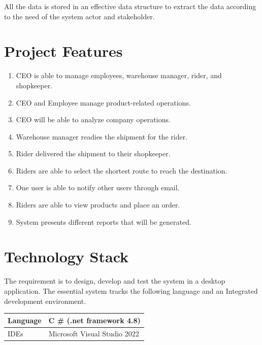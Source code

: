 \documentclass[12pt,a4paper]{report}
\begin{document}
All the data is stored in an effective data structure to extract the data according to the need of the system actor and stakeholder.

\newpage
\chapter {Project Features}

\begin{enumerate}
\item CEO is able to manage employees, warehouse manager, rider, and shopkeeper.  
\item CEO and Employee manage product-related operations.
\item CEO will be able to analyze company operations.  
\item Warehouse manager readies the shipment for the rider. 
\item Rider delivered the shipment to their shopkeeper. 
\item Riders are able to select the shortest route to reach the destination.  
\item One user is able to notify other users through email.
\item Riders are able to view products and place an order. 
\item System presents different reports that will be generated.

\end{enumerate}

\newpage
\chapter {Technology Stack}
The requirement is to design, develop and test the system in a desktop application. The essential system tracks the following language and an Integrated development environment.
 \\ 
\begin{tabularx}{0.9\textwidth} { 
  | >{\raggedright\arraybackslash}X 
  | >{\centering\arraybackslash}X |
  }
  \hline
 Language & C \# (.net framework 4.8)   \\
 \hline
IDEs  & Microsoft Visual Studio 2022  \\
\hline
\end{tabularx}

\newpage
\end{document}

